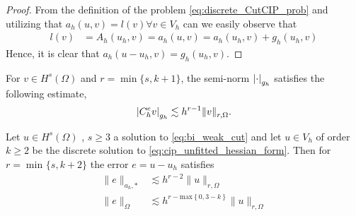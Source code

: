 \begin{proof}
   From the definition of the problem \eqref{eq:discrete_CutCIP_prob} and utilizing that $a_{h}( u,v) = l(v ) \forall v \in V_{h} $ can we easily observe that \[
       \begin{split}
   l(v ) & =  A_{h}( u_{h},v) =  a_{h}( u,v)  = a_{h}( u_{h},v)+g_{h}( u_{h},v)
       \end{split}
   \]
    Hence, it is clear that $a_{h}( u -  u_{h}, v) = g_{h}( u_{h},v)  $.
\end{proof}

\begin{assumption}[EP2]
    \label{as:bi_EP2}
    For $v \in H^{s}( \Omega ) $ and $r = \min \{s,k+1 \} $, the semi-norm $\left\lvert  \cdot   \right\rvert_{g_{h}} $ satisfies the following estimate, \[
    \left\lvert  C _{h}^{e} v  \right\rvert _{g_{h}} \lesssim  h^{r-1} \| v \|_{ r,\Omega  }^{  }.
    \]
\end{assumption}


\begin{theorem}
    \label{thm:apriori_result}
    Let $u \in H^{s}( \Omega ) $ , $s\ge 3$ a solution to \eqref{eq:bi_weak_cut} and let $u \in V_{h}$ of order $k\ge 2$ be the discrete solution to \eqref{eq:cip_unfitted_hessian_form}. Then for $r = \min_{}\{s, k+2\} $ the error $e = u - u_{h}$ satisfies
    \begin{align}
        \label{eq:bi_apriori_1}
            \| e \|_{ a_{h},* }^{  } &\lesssim   h^{r-2} \| u \|_{ r,\Omega  }^{  }\\
        \label{eq:bi_apriori_2}
        \| e \|_{ \Omega  }^{  } &\lesssim   h^{r-\mathrm{max}\left\{ 0, 3-k \right\} } \| u \|_{ r,\Omega  }^{  }
    \end{align}

\end{theorem}

